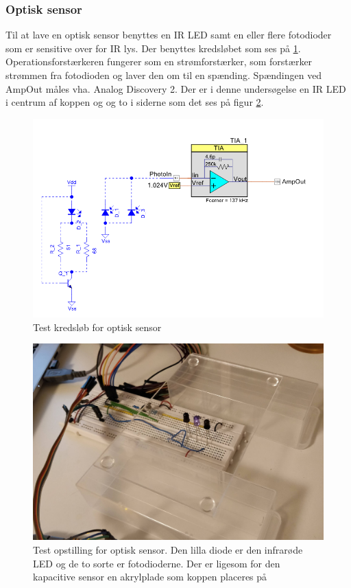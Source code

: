\documentclass[HardwareDesign/HardwareDesign_main.tex]{subfiles}
\begin{document}
\subsubsection{Optisk sensor}
Til at lave en optisk sensor benyttes en IR LED samt en eller flere fotodioder som er sensitive over for IR lys. Der benyttes kredsløbet som ses på \ref{fig:optic_test_diagram}. Operationsforstærkeren fungerer som en strømforstærker, som forstærker strømmen fra fotodioden og laver den om til en spænding. Spændingen ved AmpOut måles vha. Analog Discovery 2. Der er i denne undersøgelse en IR LED i centrum af koppen og og to i siderne som det ses på figur \ref{fig:optic_opstilling}. 
\begin{figure}[H]
    \centering
    \includegraphics[width=\textwidth]{HardwareDesign/CupSensor/graphics/OpticTest/diagram.PNG}
    \caption{Test kredsløb for optisk sensor}
    \label{fig:optic_test_diagram}
\end{figure}

\begin{figure}[H]
    \centering
    \includegraphics[width=\textwidth]{HardwareDesign/CupSensor/graphics/OpticTest/Optic_testopstillign.jpg}
    \caption{Test opstilling for optisk sensor. Den lilla diode er den infrarøde LED og de to sorte er fotodioderne. Der er ligesom for den kapacitive sensor en akrylplade som koppen placeres på}
    \label{fig:optic_opstilling}
\end{figure}
\end{document}
